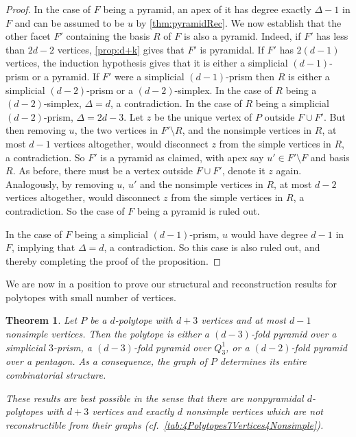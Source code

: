 \documentclass[a4paper]{amsart}
\newtheorem{theorem}{Theorem}
\theoremstyle{definition}
\theoremstyle{remark}
\begin{document}
\begin{proof}
In the case of $F$ being a pyramid, an apex of it has degree exactly ${\Delta}-1$ in $F$ and can be assumed to be $u$ by \cref{thm:pyramidRec}. We now establish that the other facet $F'$ containing the basis $R$ of $F$ is also a pyramid. Indeed, if  $F'$ has less than $2d-2$ vertices, \cref{prop:d+k} gives that $F'$ is pyramidal. If $F'$ has $2(d-1)$ vertices, the induction hypothesis gives that it is either a simplicial $(d-1)$-prism or a pyramid. If $F'$ were a simplicial $(d-1)$-prism then $R$ is either a simplicial $(d-2)$-prism or a $(d-2)$-simplex. In the case of $R$ being a  $(d-2)$-simplex, $\Delta=d$, a contradiction. In the case of $R$ being a simplicial $(d-2)$-prism, $\Delta=2d-3$. Let $z$ be the unique vertex of $P$ outside $F\cup F'$. But then removing  $u$, the two vertices in $F'\setminus R$,  and the nonsimple vertices in $R$, at most $d-1$ vertices altogether, would disconnect $z$ from the simple vertices in $R$, a contradiction. So $F'$ is a pyramid as claimed, with apex say $u'\in F'\setminus F$ and basis $R$. As before, there must be a  vertex outside $F\cup F'$, denote it $z$ again.  Analogously, by removing  $u$, $u'$  and the nonsimple vertices in $R$, at most $d-2$ vertices altogether, would disconnect $z$ from the simple vertices in $R$, a contradiction. So the case of $F$ being a pyramid is ruled out.
   
In the case of $F$ being a simplicial $(d-1)$-prism, $u$ would have degree $d-1$ in $F$, implying that ${\Delta}=d$, a contradiction. So this case is also ruled out, and thereby completing the proof of the proposition.\end{proof} 

We are now in a position to prove our structural and reconstruction results for polytopes with small number of vertices.

\begin{theorem}\label{thm:dPlus3VertRec}	Let $P$ be a $d$-polytope with $d+3$ vertices and  at most $d-1$ nonsimple vertices. Then the polytope is either a  $(d-3)$-fold  pyramid over  a simplicial $3$-prism,  a $(d-3)$-fold  pyramid over  $Q^1_3$,  or a $(d-2)$-fold pyramid over a pentagon. As a consequence, the graph of $P$ determines its entire combinatorial structure. 

These results are best possible in the sense that there are nonpyramidal  $d$-polytopes with $d+3$ vertices and exactly $d$ nonsimple vertices which are not reconstructible from their graphs (cf.~\cref{tab:4Polytopes7Vertices4Nonsimple}).

\end{theorem}
\end{document}
